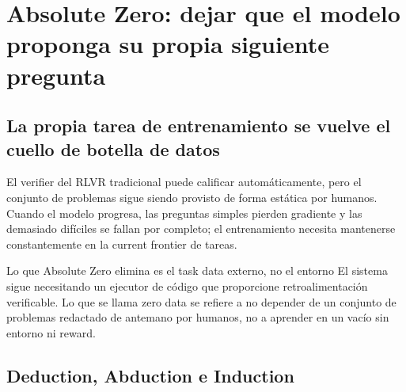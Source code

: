 \section{Absolute Zero: dejar que el modelo proponga su propia siguiente pregunta}

\subsection{La propia tarea de entrenamiento se vuelve el cuello de botella de datos}


El verifier del RLVR tradicional puede calificar automáticamente, pero el conjunto de problemas sigue siendo provisto de forma estática por humanos. Cuando el modelo progresa, las preguntas simples pierden gradiente y las demasiado difíciles se fallan por completo; el entrenamiento necesita mantenerse constantemente en la current frontier de tareas.



\begin{importantbox}{Lo que Absolute Zero elimina es el task data externo, no el entorno}
El sistema sigue necesitando un ejecutor de código que proporcione retroalimentación verificable. Lo que se llama zero data se refiere a no depender de un conjunto de problemas redactado de antemano por humanos, no a aprender en un vacío sin entorno ni reward.
\end{importantbox}

\subsection{Deduction, Abduction e Induction}

